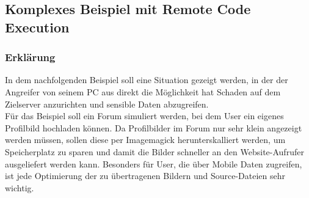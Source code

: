 
\subsection{Komplexes Beispiel mit Remote Code Execution}\label{subsec:komplexes-beispiel-mit-remote-code-execution}

\subsubsection{Erklärung}
In dem nachfolgenden Beispiel soll eine Situation gezeigt werden, in der der Angreifer von seinem PC aus direkt die Möglichkeit hat Schaden auf dem Zielserver anzurichten und sensible Daten abzugreifen.\\

Für das Beispiel soll ein Forum simuliert werden, bei dem User ein eigenes Profilbild hochladen können.
Da Profilbilder im Forum nur sehr klein angezeigt werden müssen, sollen diese per Imagemagick herunterskalliert werden, um Speicherplatz zu sparen und damit die Bilder schneller an den Website-Aufrufer ausgeliefert werden kann.
Besonders für User, die über Mobile Daten zugreifen, ist jede Optimierung der zu übertragenen Bildern und Source-Dateien sehr wichtig.